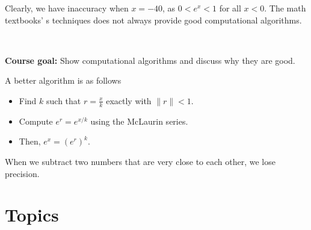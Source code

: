 Clearly, we have inaccuracy when \( x = -40 \), as \( 0 < e^x < 1 \) for all \( x < 0 \). The math textbooks'
s techniques does not always provide good computational algorithms.

    {~~~}

\textbf{Course goal:} Show computational algorithms and discuss why they are good.

\begin{example}
    A better algorithm is as follows

    \begin{itemize}
        \item Find \( k \) such that \( r = \frac{x}{k} \) exactly with \( \|r \| < 1 \).
        \item Compute $e^{r} = e^{x/k}$ using the McLaurin series.
        \item Then, $e^x = (e^r)^k$.
    \end{itemize}
\end{example}

\begin{remark}
    When we subtract two numbers that are very close to each other, we lose precision.
\end{remark}

\section{Topics}

